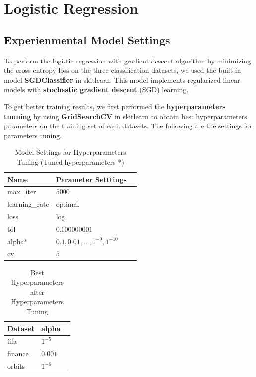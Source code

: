 \documentclass{article}
\begin{document}
\pagebreak

\section{Logistic Regression}

\subsection{Experienmental Model Settings}

To perform the logistic regression with gradient-descent algorithm by minimizing the cross-entropy loss on the three classification datasets, we used the built-in model \textbf{SGDClassifier} in skitlearn. This model implements regularized linear models with \textbf{stochastic gradient descent} (SGD) learning. 


To get better training results, we first performed the \textbf{hyperparameters tunning} by using \textbf{GridSearchCV} in skitlearn to obtain best hyperparameters parameters on the training set of each datasets. The following are the settings for parameters tuning.

\begin{table}[htb]
	\caption{Model Settings for Hyperparameters Tuning (Tuned hyperparameters *)}
	\label{sample-table}
	\centering
	\begin{tabular}{lll}
		\toprule
		\cmidrule{1-2}
		Name     &  Parameter Setttings	\\
		\midrule
		max\_iter 		  & 	$5000$  \\
		learning\_rate 		  & 	optimal  \\
		loss 		  & 	log  \\
		tol      	          & 	  $0.000000001$        \\
		alpha* 		  & 	$0.1, 0.01,...,1^{-9}, 1^{-10}$    \\
		cv		  &   $5$     \\
		\bottomrule
	\end{tabular}
\end{table}

\begin{table}[htb]
	\caption{Best Hyperparameters after Hyperparameters Tuning}
	\label{sample-table}
	\centering
	\begin{tabular}{lll}
		\toprule
		\cmidrule{1-2}
		Dataset     &  alpha	\\
		\midrule
		fifa & $1^{-5}$  \\
		finance & $0.001$        \\
		orbits & $1^{-6}$ \\
		\bottomrule
	\end{tabular}
\end{table}
\end{document}
